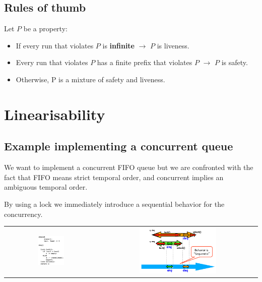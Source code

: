 \documentclass{article}
\theoremstyle{definition}
\begin{document}
\subsection{Rules of thumb}

Let $P$ be a property:
\begin{itemize}
\item If every run that violates $P$ is \textbf{infinite} $\rightarrow$ $P$ is liveness.
\item Every run that violates $P$ has a finite prefix that violates $P$ $\rightarrow$ $P$ is safety.
\item Otherwise, P is a mixture of safety and liveness.
\end{itemize}

\section{Linearisability}

\subsection{Example implementing a concurrent queue}

We want to implement a concurrent FIFO queue but we are confronted with the fact that FIFO means strict temporal order, and concurrent implies an ambiguous temporal order.

By using a lock we immediately introduce a sequential behavior for the concurrency.

\begin{center}
\begin{tabular}{c c}
\includegraphics[width=0.3\textwidth]{FIFO_lock} &
\includegraphics[width=0.5\textwidth]{FIFO_seq}
\end{tabular}
\end{center}
\end{document}
